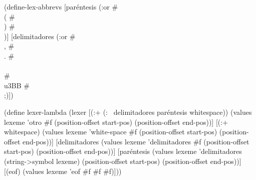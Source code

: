 \documentclass[letterpaper, twoside, openright, 11pt]{book}%
\begin{document}
\nwenddocs{}\endmoddef\nwstartdeflinemarkup{}\nwenddeflinemarkup
(define-lex-abbrevs
  [paréntesis (:or #\\( #\\) #\\[ #\\])]
  [delimitadores (:or #\\, #\\. #\\\\ #\\u3BB #\\;)])

(define lexer-lambda
  (lexer
   [(:+ (:~ delimitadores paréntesis whitespace))
    (values lexeme 'otro #f
            (position-offset start-pos)
            (position-offset end-pos))]
   [(:+ whitespace)
    (values lexeme 'white-space #f
            (position-offset start-pos)
            (position-offset end-pos))]
   [delimitadores
    (values lexeme 'delimitadores #f
            (position-offset start-pos)
            (position-offset end-pos))]
   [paréntesis
    (values lexeme 'delimitadores (string->symbol lexeme)
            (position-offset start-pos)
            (position-offset end-pos))]
   [(eof)
    (values lexeme 'eof #f #f #f)]))
\end{document}
